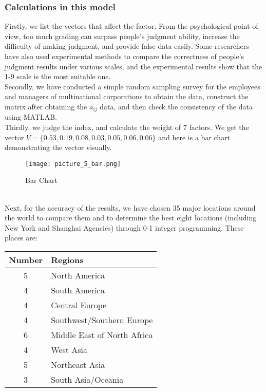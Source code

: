\documentclass{mcmthesis}
\begin{document}
\subsubsection{Calculations in this model}
\hspace*{8mm}Firstly, we list the vectors that affect the factor. From the psychological point of view, too much grading can surpass people's judgment ability, increase the difficulty of making judgment, and provide false data easily. Some researchers have also used experimental methods to compare the correctness of people's judgment results under various scales, and the experimental results show that the 1-9 scale is the most suitable one.\\
\hspace*{8mm}Secondly, we have conducted a simple random sampling survey for the employees and managers of multinational corporations to obtain the data, construct the matrix after obtaining the $a_{ij}$ data, and then check the consistency of the data using MATLAB.  \\
\hspace*{8mm}Thirdly, we judge the index, and calculate the weight of 7 factors. We get the vector $V=\{0.53,0.19, 0.08, 0.03, 0.05, 0.06, 0.06\}$ and here is a bar chart demonstrating the vector visually.\\
\begin{figure}[h]
\centering
\texttt{[image: picture\_5\_bar.png]}
\caption{Bar Chart} \label{fig:Bar Chart}
\end{figure} \\
\hspace*{8mm}Next, for the accuracy of the results, we have chosen 35 major locations around the world to compare them and to determine the best eight locations (including New York and Shanghai Agencies) through 0-1 integer programming. These places are: \hspace*{8mm}
\begin{tabular}{c|l}
Number & Regions \\
\hline 5 & North America \\
4 & South America \\
4 & Central Europe \\
4 & Southwest/Southern Europe \\
6 & Middle East of North Africa \\
4 & West Asia \\
5 & Northeast Asia \\
3 & South Asia/Oceania \\
\end{tabular} \\
\end{document}
